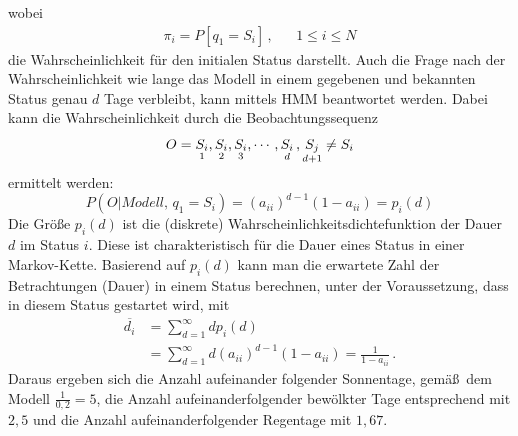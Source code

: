 wobei
\begin{align} \label{E:PropMarkovWetterPi}
\pi _i = P[q_1 = S_i]\, , & & 1 \leq i \leq N
\end{align}
die Wahrscheinlichkeit f\"ur den initialen Status darstellt.
\newline
Auch die Frage nach der Wahrscheinlichkeit wie lange das Modell in einem gegebenen und bekannten Status genau $d$ Tage verbleibt, kann mittels \gls{HMM} beantwortet werden. Dabei kann die Wahrscheinlichkeit durch die Beobachtungssequenz
\begin{equation}
O = {\underset{1}{S_i}, \underset{2}{S_i}, \underset{3}{S_i}, \cdots, \underset{d}{S_i}\, , \underset{d+1}{S_j} \ne S_i} \notag
\end{equation}
ermittelt werden:
\begin{equation}
\label{E:PropMarkovD}
P(O | Modell,\, q_1 = S_i) = (a_{ii})^{d-1}(1 - a_{ii}) = p_i(d)
\end{equation}
Die Gr\"o\ss e $p_i(d)$ ist die (diskrete) Wahrscheinlichkeitsdichtefunktion der Dauer $d$ im Status $i$. Diese ist charakteristisch f\"ur die Dauer eines Status in einer Markov-Kette. Basierend auf $p_i(d)$ kann man die erwartete Zahl der Betrachtungen (Dauer) in einem Status berechnen, unter der Voraussetzung, dass in diesem Status gestartet wird, mit
\begin{subequations}\label{E:MarkovDuration}
    \begin{alignat}{2}
      \overline{d_i} &= \sum_{d= 1}^{\infty} dp_i(d)\label{E:MarkovDuration1}\\
      &= \sum_{d = 1}^{\infty} d(a_{ii})^{d - 1} (1 - a_{ii}) = \frac{1}{1 - a_{ii}} \, . \label{E:MarkovDuration2}
    \end{alignat}
  \end{subequations}
Daraus ergeben sich die Anzahl aufeinander folgender Sonnentage, gem\"a\ss \, dem Modell $\frac{1}{0,2} = 5$,  die Anzahl aufeinanderfolgender bew\"olkter Tage entsprechend mit $2,5$ und die Anzahl aufeinanderfolgender Regentage mit $1,67$.

